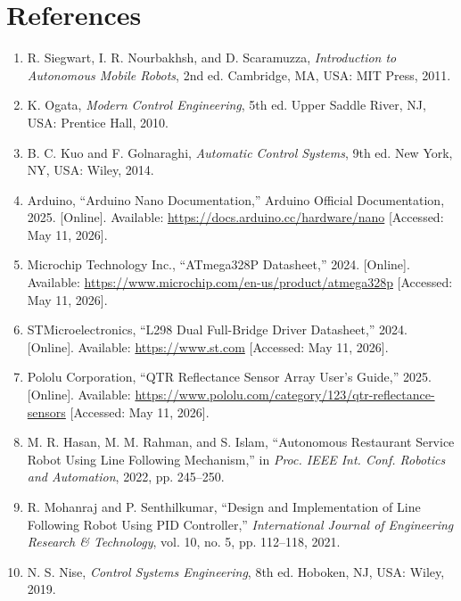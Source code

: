 \documentclass[12pt,a4paper,oneside]{report}
\begin{document}
\chapter*{References}

\begin{enumerate}

\item R. Siegwart, I. R. Nourbakhsh, and D. Scaramuzza,
\textit{Introduction to Autonomous Mobile Robots},
2nd ed. Cambridge, MA, USA: MIT Press, 2011.

\item K. Ogata,
\textit{Modern Control Engineering},
5th ed. Upper Saddle River, NJ, USA: Prentice Hall, 2010.

\item B. C. Kuo and F. Golnaraghi,
\textit{Automatic Control Systems},
9th ed. New York, NY, USA: Wiley, 2014.

\item Arduino,
“Arduino Nano Documentation,”
Arduino Official Documentation, 2025.
[Online]. Available:
\url{https://docs.arduino.cc/hardware/nano}
[Accessed: May 11, 2026].

\item Microchip Technology Inc.,
“ATmega328P Datasheet,”
2024.
[Online]. Available:
\url{https://www.microchip.com/en-us/product/atmega328p}
[Accessed: May 11, 2026].

\item STMicroelectronics,
“L298 Dual Full-Bridge Driver Datasheet,”
2024.
[Online]. Available:
\url{https://www.st.com}
[Accessed: May 11, 2026].

\item Pololu Corporation,
“QTR Reflectance Sensor Array User’s Guide,”
2025.
[Online]. Available:
\url{https://www.pololu.com/category/123/qtr-reflectance-sensors}
[Accessed: May 11, 2026].

\item M. R. Hasan, M. M. Rahman, and S. Islam,
“Autonomous Restaurant Service Robot Using Line Following Mechanism,”
in \textit{Proc. IEEE Int. Conf. Robotics and Automation},
2022, pp. 245--250.

\item R. Mohanraj and P. Senthilkumar,
“Design and Implementation of Line Following Robot Using PID Controller,”
\textit{International Journal of Engineering Research \& Technology},
vol. 10, no. 5, pp. 112--118, 2021.

\item N. S. Nise,
\textit{Control Systems Engineering},
8th ed. Hoboken, NJ, USA: Wiley, 2019.


\end{enumerate}
\end{document}
